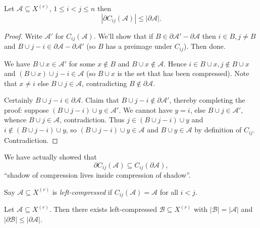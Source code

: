 \documentclass[a4paper]{article}
\newcommand{\shadow}{\partial}
\begin{document}
\begin{proposition}
  \label{prop:ij-compression}
  Let \(\mathcal A \subseteq X^{(r)}\), \(1 \leq i < j \leq n\) then
  \[
    |\shadow C_{ij}(\mathcal A)| \leq |\shadow \mathcal A|.
  \]
\end{proposition}

\begin{proof}
  Write \(\mathcal A'\) for \(C_{ij} (\mathcal A)\). We'll show that if \(B \in \shadow \mathcal A' - \shadow \mathcal A\) then \(i \in B, j \neq B\) and \(B \cup j - i \in \shadow \mathcal A - \shadow \mathcal A'\) (so \(B\) has a preimage under \(C_{ij}\)). Then done.

  We have \(B \cup x \in \mathcal A'\) for some \(x \notin B\) and \(B \cup x \notin \mathcal A\). Hence \(i \in B \cup x, j \notin B \cup x\) and \((B \cup x) \cup j - i \in \mathcal A\) (so \(B \cup x\) is the set that has been compressed). Note that \(x \neq i\) else \(B \cup j \in \mathcal A\), contradicting \(B \notin \shadow \mathcal A\).

  Certainly \(B \cup j - i \in \shadow \mathcal A\). Claim that \(B \cup j - i \notin \shadow \mathcal A'\), thereby completing the proof: suppose \((B \cup j - i) \cup y \in \mathcal A'\). We cannot have \(y = i\), else \(B \cup j \in \mathcal A'\), whence \(B \cup j \in \mathcal A\), contradiction. Thus \(j \in (B \cup j - i) \cup y\) and \(i \notin (B \cup j - i) \cup y\), so \((B \cup j - i) \cup y \in \mathcal A\) and \(B \cup y \in \mathcal A\) by definition of \(C_{ij}\). Contradiction.
\end{proof}

\begin{remark}
  We have actually showed that
  \[
    \shadow C_{ij}(\mathcal A) \subseteq C_{ij} (\shadow \mathcal A),
  \]
  ``shadow of compression lives inside compression of shadow''.
\end{remark}

\begin{definition}
  Say \(\mathcal A \subseteq X^{(r)}\) is \emph{left-compressed} if \(C_{ij}(\mathcal A) = \mathcal A\) for all \(i < j\).
\end{definition}

\begin{proposition}
  \label{prop:left compression decreases shadow}
  Let \(\mathcal A \subseteq X^{(r)}\). Then there exists left-compressed \(\mathcal B \subseteq X^{(r)}\) with \(|\mathcal B| = |\mathcal A|\) and \(|\shadow \mathcal B| \leq |\shadow \mathcal A|\).
\end{proposition}
\end{document}
